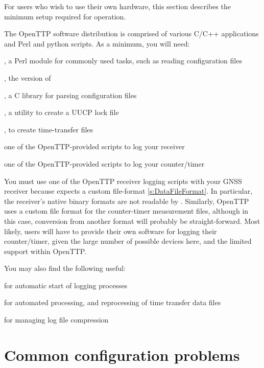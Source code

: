 For users who wish to use their own hardware,
this section describes the minimum setup required for operation.

The OpenTTP software distribution is comprised of various C/C++ applications and Perl and python scripts.
As a minimum, you will need:
\begin{description*}
	\item {}, a Perl module for commonly used tasks, such as reading configuration files
	\item {}, the  version of 
	\item {}, a C library for parsing configuration files
	\item {}, a utility to create a UUCP lock file
	\item {}, to create time-transfer files
	\item one of the OpenTTP-provided scripts to log your receiver
	\item one of the OpenTTP-provided scripts to log your counter/timer
\end{description*}

You must use one of the OpenTTP receiver logging scripts with your GNSS receiver because 
expects a custom file-format \ref{s:DataFileFormat}. In particular, the
receiver's native binary formats are not readable by . Similarly, OpenTTP uses a custom file
format for the counter-timer measurement files, although in this case, conversion from another format
will probably be straight-forward. Most likely, users will have to provide their own software for
logging their counter/timer, given the large number of possible devices here, and the limited
support within OpenTTP.


You may also find the following useful:
\begin{description*}
	\item[]  for automatic start of logging processes
	\item[]  for automated processing, and reprocessing of time transfer data files
	\item[]  for managing log file compression
\end{description*}


\section{Common configuration problems}

